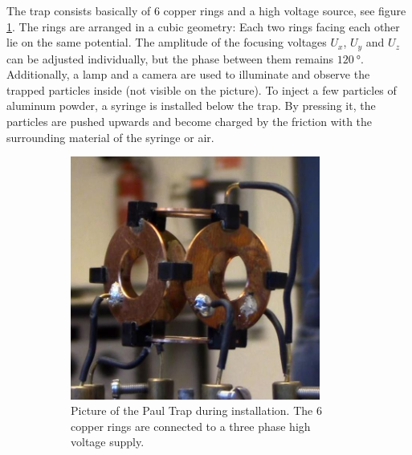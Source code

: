 \documentclass[
	paper=A4,
	parskip=full,
	chapterprefix=true,
	11pt,
	headings=normal,
	bibliography=totoc,
	listof=totoc,
	titlepage=on,
]{scrreprt}
\begin{document}
The trap consists basically of 6 copper rings and a high voltage source, see figure \ref{fig:trap}. The rings are arranged in a cubic geometry: Each two rings facing each other lie on the same potential. The amplitude of the focusing voltages $U_x$, $U_y$ and $U_z$ can be adjusted individually, but the phase between them remains $\SI{120}{\degree}$. Additionally, a lamp and a camera are used to illuminate and observe the trapped particles inside (not visible on the picture). To inject a few particles of aluminum powder, a syringe is installed below the trap. By pressing it, the particles are pushed upwards and become charged by the friction with the surrounding material of the syringe or air. 
\begin{figure}
	\centering
	\begin{subfigure}[t]{0.4\textwidth}
		\centering
		\includegraphics[width=0.9\textwidth]{capture_20150916_124003_cut}
		\caption{Picture of the Paul Trap during installation. The 6 copper rings are connected to a three phase high voltage supply.}
		\label{fig:trap}
	\end{subfigure}\quad
	\begin{subfigure}[t]{0.4\textwidth}
		\centering

\end{subfigure}
\end{figure}
\end{document}
